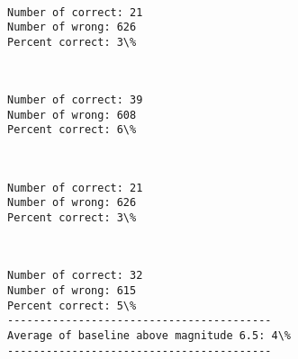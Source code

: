 \documentclass[11pt]{article}
\begin{document}
    \begin{center}
    \end{center}
    { \hspace*{\fill} \\}
    
    \begin{Verbatim}[commandchars=\\\{\}]
Number of correct: 21
Number of wrong: 626
Percent correct: 3\%

    \end{Verbatim}

    \begin{center}
    \end{center}
    { \hspace*{\fill} \\}
    
    \begin{Verbatim}[commandchars=\\\{\}]
Number of correct: 39
Number of wrong: 608
Percent correct: 6\%

    \end{Verbatim}

    \begin{center}
    \end{center}
    { \hspace*{\fill} \\}
    
    \begin{Verbatim}[commandchars=\\\{\}]
Number of correct: 21
Number of wrong: 626
Percent correct: 3\%

    \end{Verbatim}

    \begin{center}
    \end{center}
    { \hspace*{\fill} \\}
    
    \begin{Verbatim}[commandchars=\\\{\}]
Number of correct: 32
Number of wrong: 615
Percent correct: 5\%
-----------------------------------------
Average of baseline above magnitude 6.5: 4\%
-----------------------------------------

    \end{Verbatim}
\end{document}

